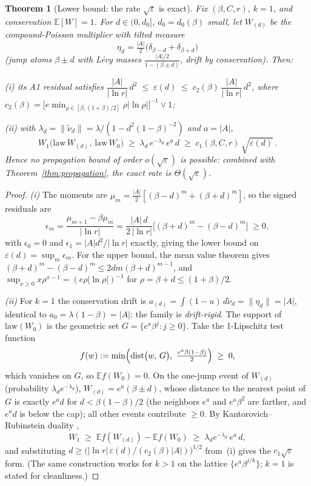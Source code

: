 \documentclass[12pt]{amsart}
\newtheorem{theorem}{Theorem}
\theoremstyle{definition}
\theoremstyle{remark}
\DeclareMathOperator{\dist}{dist}
\begin{document}
\begin{theorem}[Lower bound: the rate $\sqrt\varepsilon$ is
exact]\label{thm:lower}
Fix $(\beta, C, r)$, $k = 1$, and conservation $\mathbb{E}[W]=1$.
For $d \in (0, d_0]$, $d_0 = d_0(\beta)$ small, let $W_{(d)}$ be the
compound-Poisson multiplier with tilted measure
\[
  \eta_d = \tfrac{|A|}{2}\bigl(\delta_{\beta-d} +
  \delta_{\beta+d}\bigr)
\]
(jump atoms $\beta\pm d$ with L\'evy masses
$\tfrac{|A|/2}{1-(\beta\pm d)}$, drift by conservation).  Then:

\textup{(i)} its A1 residual satisfies
$\dfrac{|A|}{|\ln r|}\,d^2 \;\le\; \varepsilon(d) \;\le\;
c_2(\beta)\,\dfrac{|A|}{|\ln r|}\,d^2$, where $c_2(\beta) =
\bigl[e\min_{\rho\in[\beta,(1+\beta)/2]}\rho|\ln\rho|\bigr]^{-1}
\vee 1$;

\textup{(ii)} with $\lambda_d = \|\tilde\nu_d\| =
\lambda/(1 - d^2(1-\beta)^{-2})$ and $a = |A|$,
\[
  W_1\bigl(\mathrm{law}\,W_{(d)},\ \mathrm{law}\,W_0\bigr)
  \;\ge\; \lambda_d\,e^{-\lambda_d}\,e^{a}\,d
  \;\ge\; c_1(\beta, C, r)\,\sqrt{\varepsilon(d)}\,.
\]
Hence no propagation bound of order $o(\sqrt\varepsilon)$ is
possible: combined with Theorem~\ref{thm:propagation}, the exact
rate is $\Theta(\sqrt\varepsilon)$.
\end{theorem}

\begin{proof}
\textit{(i)}  The moments are $\mu_m =
\tfrac{|A|}{2}[(\beta-d)^m + (\beta+d)^m]$, so the signed residuals
are
\[
  \epsilon_m = \frac{\mu_{m+1} - \beta\mu_m}{|\ln r|}
  = \frac{|A|\,d}{2\,|\ln r|}
  \bigl[(\beta+d)^m - (\beta-d)^m\bigr] \;\ge 0,
\]
with $\epsilon_0 = 0$ and $\epsilon_1 = |A|d^2/|\ln r|$ exactly,
giving the lower bound on $\varepsilon(d) = \sup_m \epsilon_m$.  For
the upper bound, the mean value theorem gives $(\beta+d)^m -
(\beta-d)^m \le 2dm(\beta+d)^{m-1}$, and $\sup_{x\ge0} x\rho^{x-1} =
(e\rho|\ln\rho|)^{-1}$ for $\rho = \beta+d \le (1+\beta)/2$.

\textit{(ii)}  For $k=1$ the conservation drift is
$a_{(d)} = \int(1-u)\,d\tilde\nu_d = \|\eta_d\| = |A|$, identical to
$a_0 = \lambda(1-\beta) = |A|$: the family is \emph{drift-rigid}.
The support of $\mathrm{law}(W_0)$ is the geometric set $G =
\{e^{a}\beta^j : j \ge 0\}$.  Take the 1-Lipschitz test function
\[
  f(w) := \min\Bigl(\dist\bigl(w,\,G\bigr),\
  \tfrac{e^a\beta(1-\beta)}{2}\Bigr) \;\ge\; 0,
\]
which vanishes on $G$, so $\mathbb{E}f(W_0) = 0$.  On the one-jump
event of $W_{(d)}$ (probability $\lambda_d e^{-\lambda_d}$),
$W_{(d)} = e^{a}(\beta\pm d)$, whose distance to the nearest point
of $G$ is exactly $e^a d$ for $d < \beta(1-\beta)/2$ (the
neighbors $e^a$ and $e^a\beta^2$ are farther, and $e^ad$ is below
the cap); all other events contribute $\ge 0$.  By
Kantorovich--Rubinstein duality \cite{Vil09},
\[
  W_1 \;\ge\; \mathbb{E}f(W_{(d)}) - \mathbb{E}f(W_0)
  \;\ge\; \lambda_d e^{-\lambda_d}\,e^{a}\,d,
\]
and substituting $d \ge \bigl(|\ln r|\,\varepsilon(d) / (c_2(\beta)
|A|)\bigr)^{1/2}$ from~(i) gives the $c_1\sqrt{\varepsilon}$ form.
(The same construction works for $k > 1$ on the lattice
$\{e^{a}\beta^{j/k}\}$; $k = 1$ is stated for cleanliness.)
\end{proof}
\end{document}
